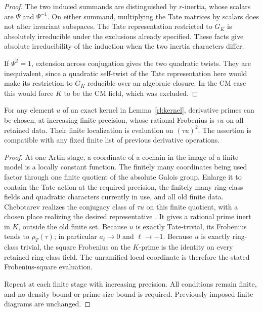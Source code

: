 \begin{proof}
The two induced summands are distinguished by $r$-inertia, whose
scalars are $\Psi$ and $\Psi^{-1}$.  On either summand, multiplying
the Tate matrices by scalars does not alter invariant subspaces.
The Tate representation restricted to $G_K$ is absolutely
irreducible under the exclusions already specified.  These facts
give absolute irreducibility of the induction when the two inertia
characters differ.

If $\Psi^2=1$, extension across conjugation gives the two quadratic
twists.  They are inequivalent, since a quadratic self-twist of the
Tate representation here would make its restriction to $G_K$
reducible over an algebraic closure.  In the CM case this would
force $K$ to be the CM field, which was excluded.
\end{proof}

\begin{lemma}
\label{rl:chebotarev-evaluation}
For any element $u$ of an exact kernel in Lemma~\ref{rl:kernel},
derivative primes can be chosen, at increasing finite precision,
whose rational Frobenius is $\tau u$ on all retained data.  Their
finite localization is evaluation on $(\tau u)^2$.  The assertion
is compatible with any fixed finite list of previous derivative
operations.
\end{lemma}

\begin{proof}
At one Artin stage, a coordinate of a cochain in the image of a
finite model is a locally constant function.  The finitely many
coordinates being used factor through one finite quotient of the
absolute Galois group.  Enlarge it to contain the Tate action at
the required precision, the finitely many ring-class fields and
quadratic characters currently in use, and all old finite data.
Chebotarev realizes the conjugacy class of $\tau u$ on this finite
quotient, with a chosen place realizing the desired representative
\citep[Chapter~V, Theorem~3.23]{MilneCFT2020}.
It gives a rational prime inert in $K$, outside the old finite set.
Because $u$ is exactly Tate-trivial, its Frobenius tends to
$\rho_T(\tau)$; in particular $a_\ell\to0$ and $\ell\to-1$.
Because $u$ is exactly ring-class trivial, the square Frobenius on
the $K$-prime is the identity on every retained ring-class field.
The unramified local coordinate is therefore the stated
Frobenius-square evaluation.

Repeat at each finite stage with increasing precision.  All
conditions remain finite, and no density bound or prime-size
bound is required.
Previously imposed finite diagrams are unchanged.
\end{proof}

